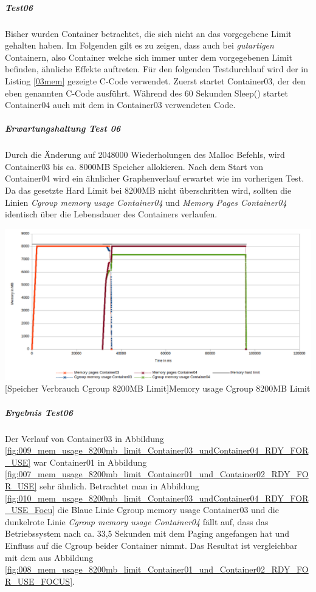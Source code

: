 \subparagraph{Test06}
Bisher wurden Container betrachtet, die sich nicht an das vorgegebene Limit gehalten haben. Im Folgenden gilt es zu zeigen, dass auch bei \emph{gutartigen} Containern, also Container welche sich immer unter dem vorgegebenen Limit befinden, ähnliche Effekte auftreten. Für den folgenden Testdurchlauf wird der in Listing \ref{03mem} gezeigte C-Code verwendet. Zuerst startet Container03, der den eben genannten C-Code ausführt. Während des 60 Sekunden Sleep() startet Container04 auch mit dem in Container03 verwendeten Code.

\vspace{1em}


\subparagraph{Erwartungshaltung Test 06}
Durch die Änderung auf 2048000 Wiederholungen des Malloc Befehls, wird Container03 bis ca. 8000MB Speicher allokieren. Nach dem Start von Container04 wird ein ähnlicher Graphenverlauf erwartet wie im vorherigen Test. Da das gesetzte Hard Limit bei 8200MB nicht überschritten wird, sollten die Linien \emph{Cgroup memory usage Container04} und \emph{Memory Pages Container04} identisch über die Lebensdauer des Containers verlaufen.

\vspace{1em}
\begin{minipage}{\linewidth}
	\centering
	\includegraphics[width=1\linewidth]{pics/009_mem_usage_8200mb_limit_Container03_undContainer04_RDY_FOR_USE.png}
	[Speicher Verbrauch Cgroup 8200MB Limit]{Memory usage Cgroup 8200MB Limit}
	\label{fig:009_mem_usage_8200mb_limit_Container03_undContainer04_RDY_FOR_USE}
\end{minipage}

\subparagraph{Ergebnis Test06}
Der Verlauf von Container03 in Abbildung \ref{fig:009_mem_usage_8200mb_limit_Container03_undContainer04_RDY_FOR_USE} war Container01 in Abbildung \ref{fig:007_mem_usage_8200mb_limit_Container01_und_Container02_RDY_FOR_USE} sehr ähnlich. Betrachtet man in Abbildung \ref{fig:010_mem_usage_8200mb_limit_Container03_undContainer04_RDY_FOR_USE_Focu} die Blaue Linie \glqq{}Cgroup memory usage Container03\grqq{} und die dunkelrote Linie \emph{Cgroup memory usage Container04} fällt auf, dass das Betriebssystem nach ca. 33,5 Sekunden mit dem Paging angefangen hat und Einfluss auf die Cgroup beider Container nimmt. Das Resultat ist vergleichbar mit dem aus Abbildung \ref{fig:008_mem_usage_8200mb_limit_Container01_und_Container02_RDY_FOR_USE_FOCUS}.  

